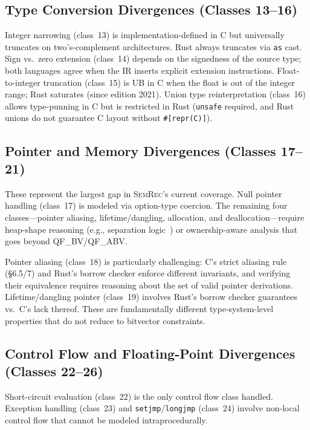\documentclass[10pt,a4paper]{article}
\begin{document}
\begin{appendices}
\subsection{Type Conversion Divergences (Classes 13--16)}

Integer narrowing (class~13) is implementation-defined in C but
universally truncates on two's-complement architectures.  Rust
always truncates via \texttt{as} cast.  Sign vs.\ zero extension
(class~14) depends on the signedness of the source type; both
languages agree when the IR inserts explicit extension instructions.
Float-to-integer truncation (class~15) is UB in C when the float
is out of the integer range; Rust saturates (since edition 2021).
Union type reinterpretation (class~16) allows type-punning in C but
is restricted in Rust (\texttt{unsafe} required, and Rust unions
do not guarantee C layout without \texttt{\#[repr(C)]}).

\subsection{Pointer and Memory Divergences (Classes 17--21)}

These represent the largest gap in \textsc{SemRec}'s current
coverage.  Null pointer handling (class~17) is modeled via
option-type coercion.  The remaining four classes---pointer aliasing,
lifetime/dangling, allocation, and deallocation---require heap-shape
reasoning (e.g., separation logic~\cite{reynolds2002separation})
or ownership-aware analysis that goes beyond QF\_BV/QF\_ABV.

Pointer aliasing (class~18) is particularly challenging: C's strict
aliasing rule (\S6.5/7) and Rust's borrow checker enforce different
invariants, and verifying their equivalence requires reasoning about
the set of valid pointer derivations.  Lifetime/dangling pointer
(class~19) involves Rust's borrow checker guarantees vs.\ C's lack
thereof.  These are fundamentally different type-system-level
properties that do not reduce to bitvector constraints.

\subsection{Control Flow and Floating-Point Divergences
(Classes 22--26)}

Short-circuit evaluation (class~22) is the only control flow class
handled.  Exception handling (class~23) and
\texttt{setjmp}/\texttt{longjmp} (class~24) involve non-local
control flow that cannot be modeled intraprocedurally.


\end{appendices}
\end{document}

